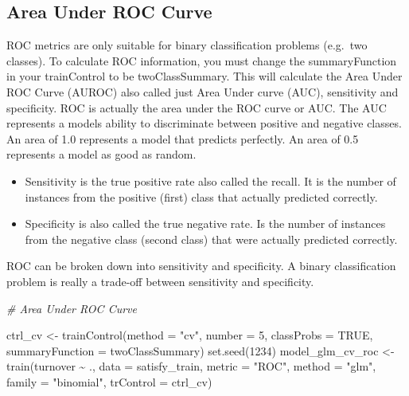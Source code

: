 \documentclass[
]{book}
\newenvironment{Shaded}{\begin{snugshade}}{\end{snugshade}}
\newcommand{\AttributeTok}[1]{\textcolor[rgb]{0.77,0.63,0.00}{#1}}
\newcommand{\CommentTok}[1]{\textcolor[rgb]{0.56,0.35,0.01}{\textit{#1}}}
\newcommand{\ConstantTok}[1]{\textcolor[rgb]{0.00,0.00,0.00}{#1}}
\newcommand{\DecValTok}[1]{\textcolor[rgb]{0.00,0.00,0.81}{#1}}
\newcommand{\FunctionTok}[1]{\textcolor[rgb]{0.00,0.00,0.00}{#1}}
\newcommand{\NormalTok}[1]{#1}
\newcommand{\OtherTok}[1]{\textcolor[rgb]{0.56,0.35,0.01}{#1}}
\newcommand{\SpecialCharTok}[1]{\textcolor[rgb]{0.00,0.00,0.00}{#1}}
\newcommand{\StringTok}[1]{\textcolor[rgb]{0.31,0.60,0.02}{#1}}
\providecommand{\tightlist}{%
  \setlength{\itemsep}{0pt}\setlength{\parskip}{0pt}}
\begin{document}
\hypertarget{area-under-roc-curve-1}{%
\subsection{Area Under ROC Curve}\label{area-under-roc-curve-1}}

ROC metrics are only suitable for binary classification problems (e.g.~two classes). To calculate ROC information, you must change the summaryFunction in your trainControl to be twoClassSummary. This will calculate the Area Under ROC Curve (AUROC) also called just Area Under curve (AUC), sensitivity and specificity.
ROC is actually the area under the ROC curve or AUC. The AUC represents a models
ability to discriminate between positive and negative classes. An area of 1.0 represents a model that predicts perfectly. An area of 0.5 represents a model as good as random.

\begin{itemize}
\tightlist
\item
  Sensitivity is the true positive rate also called the recall. It is the number of instances from the positive (first) class that actually predicted correctly.
\item
  Specificity is also called the true negative rate. Is the number of instances from the negative class (second class) that were actually predicted correctly.
\end{itemize}

ROC can be broken down into sensitivity and specificity. A binary classification problem is really a trade-off between sensitivity and specificity.

\begin{Shaded}
\begin{Highlighting}[]
\CommentTok{\# Area Under ROC Curve}

\NormalTok{ctrl\_cv }\OtherTok{\textless{}{-}} \FunctionTok{trainControl}\NormalTok{(}\AttributeTok{method =} \StringTok{"cv"}\NormalTok{, }\AttributeTok{number =} \DecValTok{5}\NormalTok{, }\AttributeTok{classProbs =} \ConstantTok{TRUE}\NormalTok{,}
                        \AttributeTok{summaryFunction =}\NormalTok{ twoClassSummary)}
\FunctionTok{set.seed}\NormalTok{(}\DecValTok{1234}\NormalTok{)}
\NormalTok{model\_glm\_cv\_roc }\OtherTok{\textless{}{-}} \FunctionTok{train}\NormalTok{(turnover }\SpecialCharTok{\textasciitilde{}}\NormalTok{ .,}
                      \AttributeTok{data =}\NormalTok{ satisfy\_train,}
                      \AttributeTok{metric =} \StringTok{"ROC"}\NormalTok{,}
                      \AttributeTok{method =} \StringTok{"glm"}\NormalTok{, }\AttributeTok{family =} \StringTok{"binomial"}\NormalTok{,}
                      \AttributeTok{trControl =}\NormalTok{ ctrl\_cv)}
\end{Highlighting}
\end{Shaded}
\end{document}

